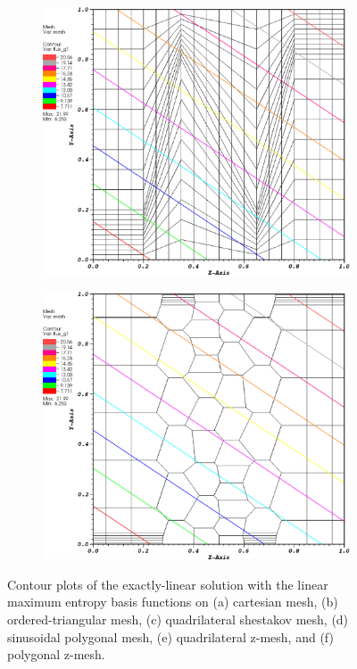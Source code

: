 \begin{figure}
\begin{subfigure}[b]{0.45\textwidth}
		\caption{}
	\end{subfigure}
	\vfill
	\begin{subfigure}[b]{0.45\textwidth}
		\centering
		\label{subfig::z_quad_me_k1_lin_sol}
		\includegraphics[width=\textwidth]{figures/sec_BF/z_quad_MAXENT_k1.eps}
		\caption{}
	\end{subfigure}
	\hfill
	\begin{subfigure}[b]{0.45\textwidth}
		\centering
		\label{subfig::z_poly_me_k1_lin_sol}
		\includegraphics[width=\textwidth]{figures/sec_BF/z_poly_MAXENT_k1.eps}
		\caption{}
	\end{subfigure}
\caption{Contour plots of the exactly-linear solution with the linear maximum entropy basis functions on (a) cartesian mesh, (b) ordered-triangular mesh, (c) quadrilateral shestakov mesh, (d) sinusoidal polygonal mesh, (e) quadrilateral z-mesh, and (f) polygonal z-mesh.}
\label{fig::BF_Results_Linear_me1_sol}
\end{figure}


